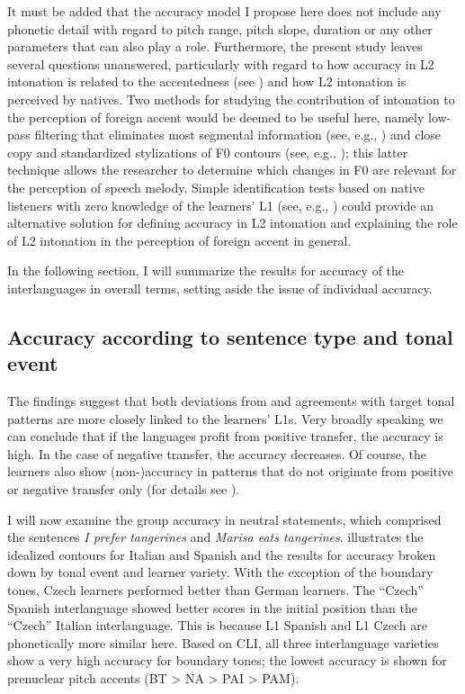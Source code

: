 It must be added that the accuracy model I propose here does not include any phonetic detail with regard to pitch range, pitch slope, duration or any other parameters that can also play a role. Furthermore, the present study leaves several questions unanswered, particularly with regard to how accuracy in L2 intonation is related to the accentedness (see \citealt{Piske2008}) and how L2 intonation is perceived by natives. Two methods for studying the contribution of intonation to the perception of foreign accent would be deemed to be useful here, namely low-pass filtering that eliminates most segmental information (see, e.g., \citealt{Jilka2000}) and close copy and standardized stylizations of F0 contours (see, e.g., \citealt{Collier1989}); this latter technique allows the researcher to determine which changes in F0 are relevant for the perception of speech melody. Simple identification tests based on native listeners with zero knowledge of the learners’ L1 (see, e.g.,  \citealt{CortésMoreno1998}) could provide an alternative solution for defining accuracy in L2 intonation and explaining the role of L2 intonation in the perception of foreign accent in general.



In the following section, I will summarize the results for accuracy of the interlanguages in overall terms, setting aside the issue of individual accuracy.


\subsection{Accuracy according to sentence type and tonal event}\label{sec:5.2.1}

The findings suggest that both deviations from and agreements with target tonal patterns are more closely linked to the learners’ L1s. Very broadly speaking we can conclude that if the languages profit from positive transfer, the accuracy is high. In the case of negative transfer, the accuracy decreases. Of course, the learners also show (non-)accuracy in patterns that do not originate from positive or negative transfer only (for details see ).


I will now examine the group accuracy in neutral statements, which comprised the sentences \textit{I prefer tangerines} and \textit{Marisa eats tangerines}.  illustrates the idealized contours for Italian and Spanish and  the results for accuracy broken down by tonal event and learner variety. With the exception of the boundary tones, Czech learners performed better than German learners. The “Czech” Spanish interlanguage showed better scores in the initial position than the “Czech” Italian interlanguage. This is because L1 Spanish and L1 Czech are phonetically more similar here. Based on CLI, all three interlanguage varieties show a very high accuracy for boundary tones; the lowest accuracy is shown for prenuclear pitch accents (BT > NA > PAI > PAM).

